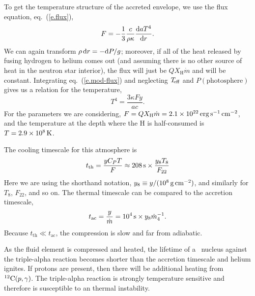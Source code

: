 To get the temperature structure of the accreted envelope, we use the flux equation, eq.~(\ref{e.flux}),
\begin{equation}\label{e.mod-flux}
F = -\frac{1}{3}\frac{c}{\rho\kappa}\frac{\mathrm{d} aT^{4}}{\mathrm{d} r}.
\end{equation}
We can again transform $\rho\,\mathrm{d} r = -\mathrm{d} P/g$; moreover, if all of the heat released by fusing hydrogen to helium comes out (and assuming there is no other source of heat in the neutron star interior), the flux will just be $QX_{\mathrm{H}}\dot{m}$ and will be constant. Integrating eq.~(\ref{e.mod-flux}) and neglecting $T_{\!\mathrm{eff}}$ and $P(\textrm{photosphere})$ gives us a relation for the temperature,
\[	T^{4} = \frac{3\kappa Fy}{ac}. \]
For the parameters we are considering, $F = QX_{\mathrm{H}}\dot{m} = 2.1\times 10^{22}\,\mathrm{erg}\,{\mathrm{s}}^{-1}\,\mathrm{c}\mathrm{m}^{-2}$, and the temperature at the depth where the H is half-consumed is $T = 2.9\times 10^{8}\,\mathrm{K}$.

The cooling timescale for this atmosphere is
\[ t_{\mathrm{th}} = \frac{yC_{P} T}{F} \approx 208\,\mathrm{s} \times \frac{y_{8} T_{8}}{F_{22}} \]
Here we are using the shorthand notation, $y_{8}\equiv y/(10^{8}\,\mathrm{g}\,{\mathrm{c}\mathrm{m}}^{-2})$, and similarly for $T_{8}$, $F_{22}$, and so on.
The thermal timescale can be compared to the accretion timescale,
\[ t_{\mathrm{ac}} = \frac{y}{\dot{m}} = 10^{4}\,\mathrm{s}\times y_{8}\dot{m}_{4}^{-1}.
\]
Because $t_{\mathrm{th}}\ll t_{\mathrm{ac}}$, the compression is slow and far from adiabatic.

As the fluid element is compressed and heated, the lifetime of a \helium\ nucleus against the triple-alpha reaction becomes shorter than the accretion timescale and helium ignites.  If protons are present, then there will be additional heating from $\mathrm{^{12}C}(p,\gamma)$.  The triple-alpha reaction is strongly temperature sensitive and therefore is susceptible to an thermal instability.

